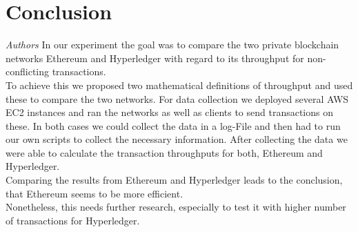\section{Conclusion}
\textit{Authors}
In our experiment the goal was to compare the two private blockchain networks Ethereum and Hyperledger with regard to its throughput for non-conflicting transactions.\\
To achieve this we proposed two mathematical definitions of throughput and used these to compare the two networks. For data collection we deployed several AWS EC2 instances and ran the networks as well as clients to send transactions on these. In both cases we could collect the data in a log-File and then had to run our own scripts to collect the necessary information. After collecting the data we were able to calculate the transaction throughputs for both, Ethereum and Hyperledger.\\
Comparing the results from Ethereum and Hyperledger leads to the conclusion, that Ethereum seems to be more efficient. \\
Nonetheless, this needs further research, especially to test it with higher number of transactions for Hyperledger.
